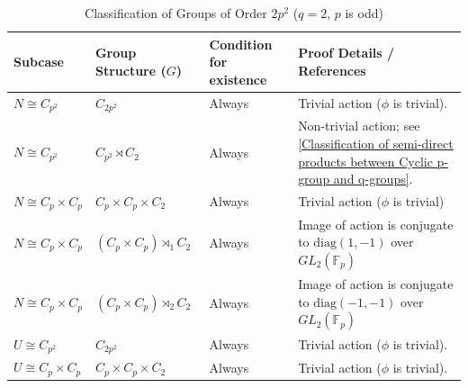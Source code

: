 \begin{table}[htbp]
\centering
\caption{Classification of Groups of Order $2p^2$ ($q = 2$, $p$ is odd)}
\label{tab:groups_p2q_classification}
\begin{tabular}{ll p{3.2cm} p{6cm}}
\toprule
\textbf{Subcase} & \textbf{Group Structure ($G$)} & \textbf{Condition for existence} & \textbf{Proof Details / References} \\
\midrule
\quad $N \cong C_{p^2}$ & $C_{2p^2}$ & Always & Trivial action ($\phi$ is trivial). \\
\quad $N \cong C_{p^2}$ & $C_{p^2} \rtimes C_2$ & Always & Non-trivial action; see \ref{Classification of semi-direct products between Cyclic p-group and q-groups}. \\
\addlinespace
\quad $N \cong C_p \times C_p$ & $C_p \times C_p \times C_2$ & Always & Trivial action ($\phi$ is trivial) \\
\quad $N \cong C_p \times C_p$ & $(C_p \times C_p) \rtimes_1 C_2$ & Always & Image of action is conjugate to $\text{diag}(1, -1)$ over $GL_2(\mathbb{F}_p)$ \\
\quad $N \cong C_p \times C_p$ & $(C_p \times C_p) \rtimes_2 C_2$ & Always & Image of action is conjugate to $\text{diag}(-1, -1)$ over $GL_2(\mathbb{F}_p)$ \\
\midrule
\quad $U \cong C_{p^2}$ & $C_{2p^2}$ & Always & Trivial action ($\phi$ is trivial). \\
\addlinespace
\quad $U \cong C_p \times C_p$ & $C_p \times C_p \times C_2$ & Always & Trivial action ($\phi$ is trivial). \\
\bottomrule
\end{tabular}
\end{table}